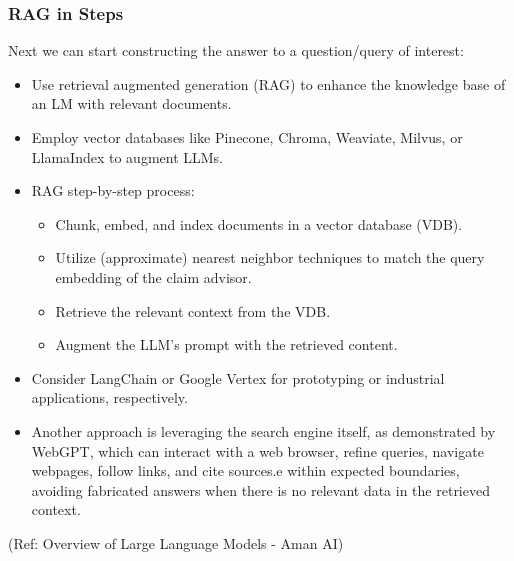 \begin{frame}[fragile]\frametitle{RAG in Steps}

Next we can start constructing the answer to a question/query of interest:

\begin{itemize}
\item Use retrieval augmented generation (RAG) to enhance the knowledge base of an LM with relevant documents.
\item Employ vector databases like Pinecone, Chroma, Weaviate, Milvus, or LlamaIndex to augment LLMs.
\item RAG step-by-step process:
	\begin{itemize}
	\item Chunk, embed, and index documents in a vector database (VDB).
	\item Utilize (approximate) nearest neighbor techniques to match the query embedding of the claim advisor.
	\item Retrieve the relevant context from the VDB.
	\item Augment the LLM's prompt with the retrieved content.
	\end{itemize}

\item Consider LangChain or Google Vertex for prototyping or industrial applications, respectively.
\item Another approach is leveraging the search engine itself, as demonstrated by WebGPT, which can interact with a web browser, refine queries, navigate webpages, follow links, and cite sources.e within expected boundaries, avoiding fabricated answers when there is no relevant data in the retrieved context.
\end{itemize}

{\tiny (Ref: Overview of Large Language Models - Aman AI)}

\end{frame}

